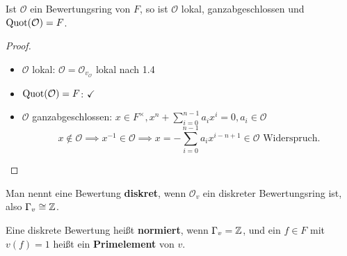 \begin{korollar}
    Ist $\mathcal{O}$ ein Bewertungsring von $F$, so ist $\mathcal{O}$ lokal, ganzabgeschlossen und $\operatorname{Quot}(\mathcal{O}) = F$.
\end{korollar}
\begin{proof}
    \begin{itemize}
        \item $\mathcal{O}$ lokal: $\mathcal{O} = \mathcal{O}_{v_\mathcal{O}}$ lokal nach 1.4
        \item $\operatorname{Quot}(\mathcal{O}) = F$: $\checkmark$
        \item $\mathcal{O}$ ganzabgeschlossen: $x \in F^\times, x^n + \sum\limits_{i=0}^{n-1}a_i x^i = 0, a_i \in \mathcal{O}$
        $$x \notin \mathcal{O} \implies x^{-1} \in \mathcal{O} \implies x = - \sum\limits_{i=0}^{n-1}a_i x^{i - n +1} \in \mathcal{O} 
        \text{ Widerspruch.}$$
    \end{itemize}
\end{proof}

\begin{bemerkungnr}
    Man nennt eine Bewertung \textbf{diskret}, wenn $\mathcal{O}_v$ ein diskreter Bewertungsring ist, also 
    $\Gamma_v \cong \mathbb{Z}$.

    Eine diskrete Bewertung heißt \textbf{normiert}, wenn $\Gamma_v = \mathbb{Z}$, und ein $f \in F$ mit $v(f) = 1$ heißt
    ein \textbf{Primelement} von $v$.
\end{bemerkungnr}

